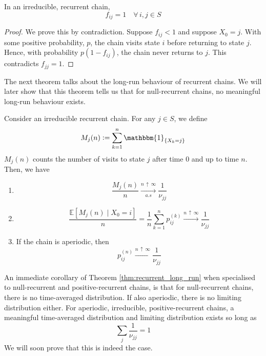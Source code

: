 \documentclass[12pt]{article}
\theoremstyle{definition}
\begin{document}
\begin{lem} \label{lem:fij_equals_1}
    In an irreducible, recurrent chain, 
    \[
        f_{ij} = 1 \quad \forall \, i,j \in S
    \]
\end{lem}

\begin{proof}
    We prove this by contradiction. Suppose $f_{ij} < 1$ and suppose $X_0 = j$. With some positive probability, $p$, the chain visits state $i$ before returning to state $j$. Hence, with probability $p(1-f_{ij})$, the chain never returns to $j$. This contradicts $f_{jj} = 1$.
\end{proof}

The next theorem talks about the long-run behaviour of recurrent chains. We will later show that this theorem tells us that for null-recurrent chains, no meaningful long-run behaviour exists.

\begin{thm} \label{thm:recurrent_long_run}
    Consider an irreducible recurrent chain. For any $j \in S$, we define
    \[
        M_j(n) \vcentcolon= \sum_{k=1}^{n} \mathbbm{1}_{\left\{ X_k = j \right\}}
    \]
    $M_j(n)$ counts the number of visits to state $j$ after time $0$ and up to time $n$. Then, we have
    \begin{enumerate}
        \item \[
            \frac{M_j(n)}{n} \xrightarrow[a.s]{n \, \uparrow \, \infty} \frac{1}{\nu_{jj}}
        \]  
        \item 
        \[
            \frac{\mathbb{E} \left[ M_j(n) \mid X_0 = i \right]}{n} = \frac{1}{n} \sum_{k=1}^{n} p_{ij}^{(k)} \xrightarrow[]{n \, \uparrow \, \infty} \frac{1}{\nu_{jj}}
        \]
        \item If the chain is aperiodic, then
        \[
            p_{ij}^{(n)} \xrightarrow[]{n \, \uparrow \, \infty} \frac{1}{\nu_{jj}}
        \]
    \end{enumerate}
\end{thm}

An immediate corollary of Theorem \ref{thm:recurrent_long_run} when specialised to null-recurrent and positive-recurrent chains, is that for null-recurrent chains, there is no time-averaged distribution. If also aperiodic, there is no limiting distribution either. For aperiodic, irreducible, positive-recurrent chains, a meaningful time-averaged distribution and limiting distribution exists so long as
\[
    \sum_{j} \frac{1}{\nu_{jj}} = 1
\]
We will soon prove that this is indeed the case. 
\end{document}
